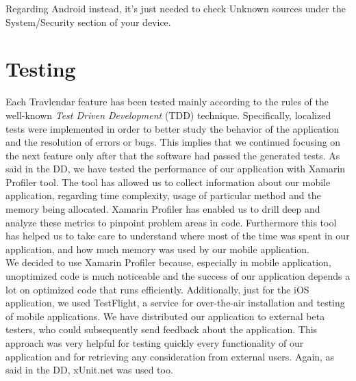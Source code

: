 Regarding Android instead, it's just needed to check Unknown sources under the System/Security section of your device.

\section{Testing}
Each Travlendar feature has been tested mainly according to the rules of the well-known \textit{Test Driven Development} (TDD) technique. Specifically, localized tests were implemented in order to better study the behavior of the application and the resolution of errors or bugs. This implies that we continued focusing on the next feature only after that the software had passed the generated tests. As said in the DD, we have tested the performance of our application with Xamarin Profiler tool. The tool has allowed us to collect information about our mobile application, regarding time complexity, usage of particular method and the memory being allocated. Xamarin Profiler has enabled us to drill deep and analyze these metrics to pinpoint problem areas in code. Furthermore this tool has helped us to take care to understand where most of the time was spent in our application, and how much memory was used by our mobile application.\\

We decided to use Xamarin Profiler because, especially in mobile application, unoptimized code is much noticeable and the success of our application depends a lot on optimized code that runs efficiently. Additionally, just for the iOS application, we used TestFlight, a service for over-the-air installation and testing of mobile applications. We have distributed our application to external beta testers, who could subsequently send feedback about the application. This approach was very helpful for testing quickly every functionality of our application and for retrieving any consideration from external users. Again, as said in the DD, xUnit.net was used too.

